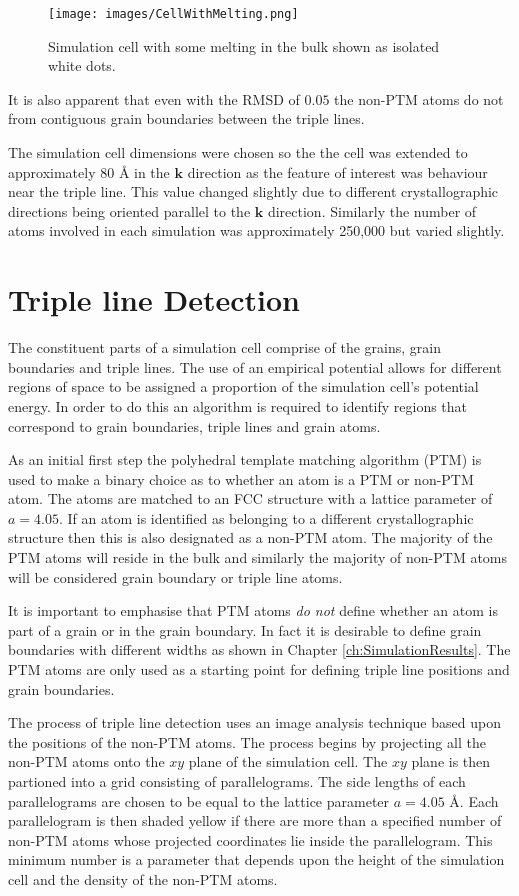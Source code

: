\documentclass[12pt,a4paper,openany]{report}
\begin{document}
\begin{figure}[H]
	\centering
	\texttt{[image: images/CellWithMelting.png]} 
	\label{fig:CellMelt}
	\caption{Simulation cell with some melting in the bulk shown
	as isolated white dots.}
\end{figure}

It is also apparent that even with the RMSD of $0.05$ the non-PTM atoms do not from contiguous grain boundaries between the triple lines.

The simulation cell dimensions were chosen so the the cell was extended to approximately $80 \textrm{ \AA}$ in the $\mathbf{k}$ direction as the feature of interest was behaviour near the triple line. This value changed slightly due to different crystallographic directions being oriented parallel to the $\mathbf{k}$ direction. Similarly the number of atoms involved in each simulation was approximately 250,000 but varied slightly.  


\section{Triple line Detection}

The constituent parts of a simulation cell comprise of the grains, grain boundaries and triple lines. The use of an empirical potential allows for different regions of space to be assigned a proportion of the simulation cell's potential energy. In order to do this an algorithm is required to identify regions that correspond to grain boundaries, triple lines and grain atoms.

As an initial first step the polyhedral template matching algorithm (PTM) is used to make a binary choice as to whether an atom is a PTM or non-PTM atom. The atoms are matched to an FCC structure with a lattice parameter of $a=4.05$. If an atom is identified as belonging to a different crystallographic structure then this is also designated as a non-PTM atom. The majority of the PTM atoms will reside in the bulk and similarly the majority of non-PTM atoms will be considered grain boundary or triple line atoms. 

It is important to emphasise that PTM atoms \emph{do not} define whether an atom is part of a grain or in the grain boundary. In fact it is desirable to define grain boundaries with different widths as shown in Chapter \ref{ch:SimulationResults}. The PTM atoms are only used as a starting point for defining triple line positions and grain boundaries.

The process of triple line detection uses an image analysis technique based upon the positions of the non-PTM atoms. The process begins by projecting all the non-PTM atoms onto the $xy$ plane of the simulation cell. The $xy$ plane is then partioned into a grid consisting of parallelograms. The side lengths of each parallelograms are chosen to be equal to the lattice parameter $a =4.05 \textrm{ \AA}$. Each parallelogram is then shaded yellow if there are more than a specified number of non-PTM atoms whose projected coordinates lie inside the parallelogram. This minimum number is a parameter that depends upon the height of the simulation cell and the density of the non-PTM atoms. 
\end{document}
